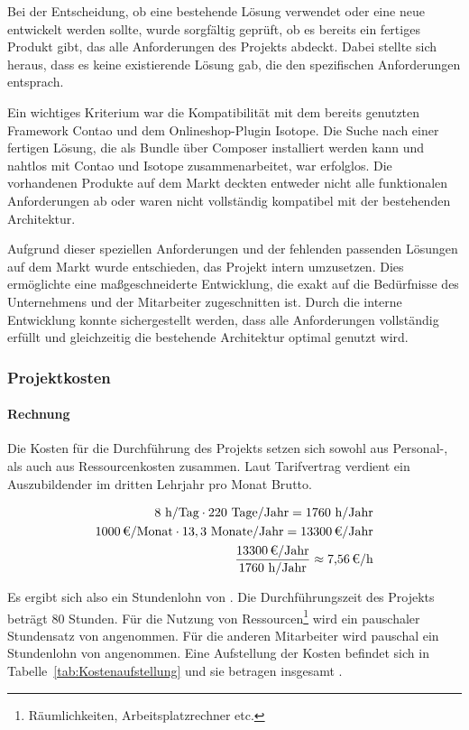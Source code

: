 Bei der Entscheidung, ob eine bestehende Lösung verwendet oder eine neue entwickelt werden sollte, wurde sorgfältig geprüft, ob es bereits ein fertiges Produkt gibt, das alle Anforderungen des Projekts abdeckt. Dabei stellte sich heraus, dass es keine existierende Lösung gab, die den spezifischen Anforderungen entsprach.

Ein wichtiges Kriterium war die Kompatibilität mit dem bereits genutzten Framework Contao und dem Onlineshop-Plugin Isotope. Die Suche nach einer fertigen Lösung, die als Bundle über Composer installiert werden kann und nahtlos mit Contao und Isotope zusammenarbeitet, war erfolglos. Die vorhandenen Produkte auf dem Markt deckten entweder nicht alle funktionalen Anforderungen ab oder waren nicht vollständig kompatibel mit der bestehenden Architektur.

Aufgrund dieser speziellen Anforderungen und der fehlenden passenden Lösungen auf dem Markt wurde entschieden, das Projekt intern umzusetzen. Dies ermöglichte eine maßgeschneiderte Entwicklung, die exakt auf die Bedürfnisse des Unternehmens und der Mitarbeiter zugeschnitten ist. Durch die interne Entwicklung konnte sichergestellt werden, dass alle Anforderungen vollständig erfüllt und gleichzeitig die bestehende Architektur optimal genutzt wird.

\subsubsection{Projektkosten}
\label{sec:Projektkosten}

\paragraph{Rechnung}
Die Kosten für die Durchführung des Projekts setzen sich sowohl aus Personal-, als auch aus Ressourcenkosten zusammen.
Laut Tarifvertrag verdient ein Auszubildender im dritten Lehrjahr pro Monat  Brutto. 

\begin{eqnarray}
8 \mbox{ h/Tag} \cdot 220 \mbox{ Tage/Jahr} = 1760 \mbox{ h/Jahr}\\
\eur{1000}\mbox{/Monat} \cdot 13,3 \mbox{ Monate/Jahr} = \eur{13300} \mbox{/Jahr}\\
\frac{\eur{13300} \mbox{/Jahr}}{1760 \mbox{ h/Jahr}} \approx \eur{7,56}\mbox{/h}
\end{eqnarray}

Es ergibt sich also ein Stundenlohn von . 
Die Durchführungszeit des Projekts beträgt 80 Stunden. Für die Nutzung von Ressourcen\footnote{Räumlichkeiten, Arbeitsplatzrechner etc.} wird 
ein pauschaler Stundensatz von  angenommen. Für die anderen Mitarbeiter wird pauschal ein Stundenlohn von  angenommen. 
Eine Aufstellung der Kosten befindet sich in Tabelle~\ref{tab:Kostenaufstellung} und sie betragen insgesamt .


